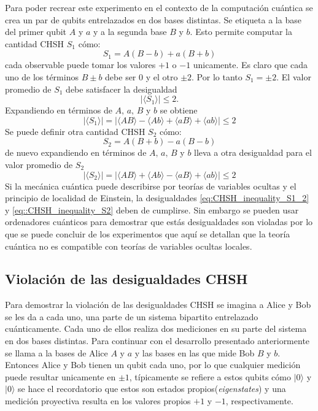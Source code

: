 \documentclass[a4paper]{article}
\begin{document}
Para poder recrear este experimento en el contexto de la computación cuántica se crea un par de qubits entrelazados en dos bases distintas. Se etiqueta a la base del primer qubit $A$ y $a$ y a la segunda base $B$ y $b$. Esto permite computar la cantidad CHSH $S_1$ cómo:
\begin{equation}\label{eq::S_1}
S_1=A(B-b)+a(B+b)
\end{equation} 
cada observable puede tomar los valores $+1$ o $-1$ unicamente. Es claro que cada uno de los términos $B\pm b$ debe ser $0$ y el otro $\pm 2$. Por lo tanto $S_1=\pm 2$. El valor promedio de $S_1$ debe satisfacer la desigualdad
\begin{equation}\label{eq::CHSH_inequality_S1}
|\langle S_1 \rangle|\leq 2.
\end{equation}
Expandiendo en términos de $A, \, a,\, B$ y $b$ se obtiene
\begin{equation}\label{eq:CHSH_inequality_S1_2}
|\langle S_1 \rangle|=|\langle A B\rangle-\langle A b \rangle + \langle a B \rangle + \langle a b \rangle| \leq 2
\end{equation}
Se puede definir otra cantidad CHSH $S_2$ cómo:
\begin{equation}
S_2=A(B+b)-a(B-b)
\end{equation}
de nuevo expandiendo en términos de $A, \, a,\, B$ y $b$  lleva a otra desigualdad para el valor promedio de $S_2$
\begin{equation}\label{eq::CHSH_inequality_S2}
|\langle S_2 \rangle|=|\langle A B\rangle+\langle A b \rangle - \langle a B \rangle + \langle a b \rangle| \leq 2
\end{equation}
Si la mecánica cuántica puede describirse por teorías de variables ocultas y el principio de localidad de Einstein, la desigualdades \ref{eq:CHSH_inequality_S1_2} y \ref{eq::CHSH_inequality_S2} deben de cumplirse. Sin embargo se pueden usar ordenadores cuánticos para demostrar que estás desigualdades son violadas por lo que se puede concluir de los experimentos que aquí se detallan que la teoría cuántica no es compatible con teorías de variables ocultas locales.
\subsection{Violación de las desigualdades CHSH}
Para demostrar la violación de las desigualdades CHSH se imagina a Alice y Bob se les da a cada uno, una parte de un sistema bipartito entrelazado cuánticamente. Cada uno de ellos realiza dos mediciones en su parte del sistema en dos bases distintas. Para continuar con el desarrollo presentado anteriormente se llama a la bases de Alice $A$ y $a$ y las bases en las que mide Bob $B$ y $b$. Entonces Alice y Bob tienen un qubit cada uno, por lo que cualquier medición puede resultar unicamente en $\pm 1$, típicamente se refiere a estos qubits cómo $|0\rangle$ y $|0\rangle$ se hace el recordatorio que estos son estados propios(\textit{eigenstates}) y una medición proyectiva resulta en los valores propios $+1$ y $-1$, respectivamente.\\
\end{document}
